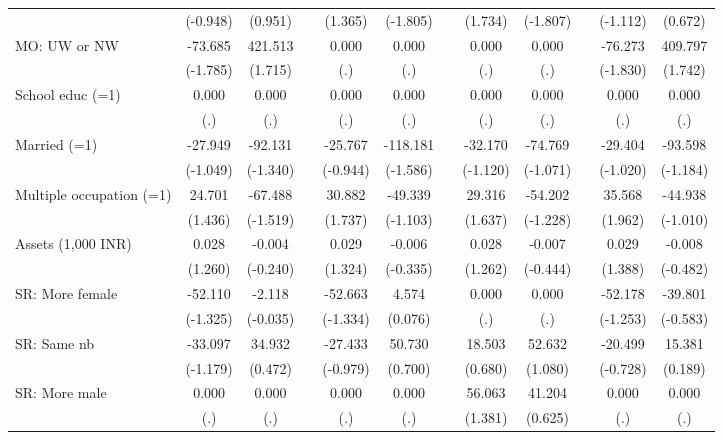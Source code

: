{\begin{longtable}{@{\extracolsep{\fill}}lccccccccccc}
          & (-0.948) & (0.951) &       & (1.365) & (-1.805) &       & (1.734) & (-1.807) &       & (-1.112) & (0.672) \\
    MO: UW or NW & -73.685 & 421.513 &       & 0.000 & 0.000 &       & 0.000 & 0.000 &       & -76.273 & 409.797 \\
          & (-1.785) & (1.715) &       & (.)   & (.)   &       & (.)   & (.)   &       & (-1.830) & (1.742) \\
    School educ (=1) & 0.000 & 0.000 &       & 0.000 & 0.000 &       & 0.000 & 0.000 &       & 0.000 & 0.000 \\
          & (.)   & (.)   &       & (.)   & (.)   &       & (.)   & (.)   &       & (.)   & (.) \\
    Married (=1) & -27.949 & -92.131 &       & -25.767 & -118.181 &       & -32.170 & -74.769 &       & -29.404 & -93.598 \\
          & (-1.049) & (-1.340) &       & (-0.944) & (-1.586) &       & (-1.120) & (-1.071) &       & (-1.020) & (-1.184) \\
    Multiple occupation (=1) & 24.701 & -67.488 &       & 30.882 & -49.339 &       & 29.316 & -54.202 &       & 35.568 & -44.938 \\
          & (1.436) & (-1.519) &       & (1.737) & (-1.103) &       & (1.637) & (-1.228) &       & (1.962) & (-1.010) \\
    Assets (1,000 INR) & 0.028 & -0.004 &       & 0.029 & -0.006 &       & 0.028 & -0.007 &       & 0.029 & -0.008 \\
          & (1.260) & (-0.240) &       & (1.324) & (-0.335) &       & (1.262) & (-0.444) &       & (1.388) & (-0.482) \\
    SR: More female & -52.110 & -2.118 &       & -52.663 & 4.574 &       & 0.000 & 0.000 &       & -52.178 & -39.801 \\
          & (-1.325) & (-0.035) &       & (-1.334) & (0.076) &       & (.)   & (.)   &       & (-1.253) & (-0.583) \\
    SR: Same nb & -33.097 & 34.932 &       & -27.433 & 50.730 &       & 18.503 & 52.632 &       & -20.499 & 15.381 \\
          & (-1.179) & (0.472) &       & (-0.979) & (0.700) &       & (0.680) & (1.080) &       & (-0.728) & (0.189) \\
    SR: More male & 0.000 & 0.000 &       & 0.000 & 0.000 &       & 56.063 & 41.204 &       & 0.000 & 0.000 \\
          & (.)   & (.)   &       & (.)   & (.)   &       & (1.381) & (0.625) &       & (.)   & (.) \\

\end{longtable}}
